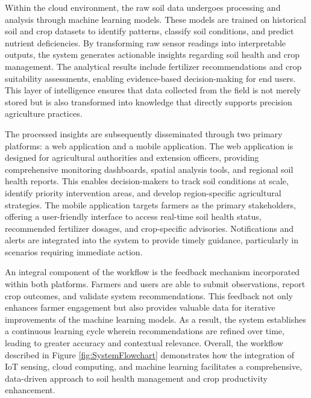 {	Within the cloud environment, the raw soil data undergoes processing and analysis through machine learning models. These models are trained on historical soil and crop datasets to identify patterns, classify soil conditions, and predict nutrient deficiencies. By transforming raw sensor readings into interpretable outputs, the system generates actionable insights regarding soil health and crop management. The analytical results include fertilizer recommendations and crop suitability assessments, enabling evidence-based decision-making for end users. This layer of intelligence ensures that data collected from the field is not merely stored but is also transformed into knowledge that directly supports precision agriculture practices.
	
	The processed insights are subsequently disseminated through two primary platforms: a web application and a mobile application. The web application is designed for agricultural authorities and extension officers, providing comprehensive monitoring dashboards, spatial analysis tools, and regional soil health reports. This enables decision-makers to track soil conditions at scale, identify priority intervention areas, and develop region-specific agricultural strategies. The mobile application targets farmers as the primary stakeholders, offering a user-friendly interface to access real-time soil health status, recommended fertilizer dosages, and crop-specific advisories. Notifications and alerts are integrated into the system to provide timely guidance, particularly in scenarios requiring immediate action.
	
	An integral component of the workflow is the feedback mechanism incorporated within both platforms. Farmers and users are able to submit observations, report crop outcomes, and validate system recommendations. This feedback not only enhances farmer engagement but also provides valuable data for iterative improvements of the machine learning models. As a result, the system establishes a continuous learning cycle wherein recommendations are refined over time, leading to greater accuracy and contextual relevance. Overall, the workflow described in Figure \ref{fig:SystemFlowchart} demonstrates how the integration of IoT sensing, cloud computing, and machine learning facilitates a comprehensive, data-driven approach to soil health management and crop productivity enhancement.
	
}
